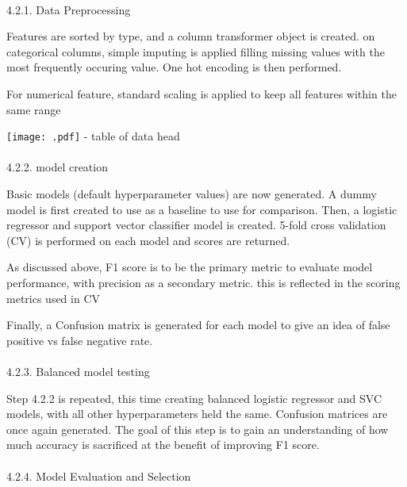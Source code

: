 \documentclass[
  letterpaper,
  DIV=11,
  numbers=noendperiod]{scrartcl}
\makeatletter
\let\oldparagraph\paragraph
\renewcommand{\paragraph}{
    \@ifstar
      \xxxParagraphStar
      \xxxParagraphNoStar
  }
\newcommand{\xxxParagraphStar}[1]{\oldparagraph*{#1}\mbox{}}
\newcommand{\xxxParagraphNoStar}[1]{\oldparagraph{#1}\mbox{}}
\makeatother
\begin{document}
\paragraph{4.2.1. Data Preprocessing}\label{data-preprocessing}

Features are sorted by type, and a column transformer object is created.
on categorical columns, simple imputing is applied filling missing
values with the most frequently occuring value. One hot encoding is then
performed.

For numerical feature, standard scaling is applied to keep all features
within the same range

\texttt{[image: .pdf]} - table of data head

\paragraph{4.2.2. model creation}\label{model-creation}

Basic models (default hyperparameter values) are now generated. A dummy
model is first created to use as a baseline to use for comparison. Then,
a logistic regressor and support vector classifier model is created.
5-fold cross validation (CV) is performed on each model and scores are
returned.

As discussed above, F1 score is to be the primary metric to evaluate
model performance, with precision as a secondary metric. this is
reflected in the scoring metrics used in CV

Finally, a Confusion matrix is generated for each model to give an idea
of false positive vs false negative rate.

\paragraph{4.2.3. Balanced model testing}\label{balanced-model-testing}

Step 4.2.2 is repeated, this time creating balanced logistic regressor
and SVC models, with all other hyperparameters held the same. Confusion
matrices are once again generated. The goal of this step is to gain an
understanding of how much accuracy is sacrificed at the benefit of
improving F1 score.

\paragraph{4.2.4. Model Evaluation and
Selection}\label{model-evaluation-and-selection}
\end{document}
